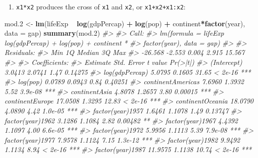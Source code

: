 \documentclass[]{book}
\newenvironment{Shaded}{\begin{snugshade}}{\end{snugshade}}
\newcommand{\KeywordTok}[1]{\textcolor[rgb]{0.13,0.29,0.53}{\textbf{#1}}}
\newcommand{\DataTypeTok}[1]{\textcolor[rgb]{0.13,0.29,0.53}{#1}}
\newcommand{\DecValTok}[1]{\textcolor[rgb]{0.00,0.00,0.81}{#1}}
\newcommand{\StringTok}[1]{\textcolor[rgb]{0.31,0.60,0.02}{#1}}
\newcommand{\CommentTok}[1]{\textcolor[rgb]{0.56,0.35,0.01}{\textit{#1}}}
\newcommand{\OperatorTok}[1]{\textcolor[rgb]{0.81,0.36,0.00}{\textbf{#1}}}
\newcommand{\NormalTok}[1]{#1}
\providecommand{\tightlist}{%
  \setlength{\itemsep}{0pt}\setlength{\parskip}{0pt}}
\begin{document}
\begin{enumerate}
\def\labelenumi{\arabic{enumi}.}
\setcounter{enumi}{1}
\tightlist
\item
  \texttt{x1*x2} produces the cross of \texttt{x1} and \texttt{x2}, or
  \texttt{x1+x2+x1:x2}:
\end{enumerate}

\begin{Shaded}
\begin{Highlighting}[]
\NormalTok{mod.}\DecValTok{2}\NormalTok{ <-}\StringTok{ }\KeywordTok{lm}\NormalTok{(lifeExp }\OperatorTok{~}\StringTok{ }\KeywordTok{log}\NormalTok{(gdpPercap) }\OperatorTok{+}\StringTok{ }\KeywordTok{log}\NormalTok{(pop) }\OperatorTok{+}\StringTok{ }\NormalTok{continent}\OperatorTok{*}\KeywordTok{factor}\NormalTok{(year), }\DataTypeTok{data =}\NormalTok{ gap)}
\KeywordTok{summary}\NormalTok{(mod.}\DecValTok{2}\NormalTok{)}
\CommentTok{#> }
\CommentTok{#> Call:}
\CommentTok{#> lm(formula = lifeExp ~ log(gdpPercap) + log(pop) + continent * }
\CommentTok{#>     factor(year), data = gap)}
\CommentTok{#> }
\CommentTok{#> Residuals:}
\CommentTok{#>     Min      1Q  Median      3Q     Max }
\CommentTok{#> -26.568  -2.553   0.004   2.915  15.567 }
\CommentTok{#> }
\CommentTok{#> Coefficients:}
\CommentTok{#>                                    Estimate Std. Error t value Pr(>|t|)    }
\CommentTok{#> (Intercept)                          3.0413     2.0741    1.47  0.14275    }
\CommentTok{#> log(gdpPercap)                       5.0795     0.1605   31.65  < 2e-16 ***}
\CommentTok{#> log(pop)                             0.0789     0.0943    0.84  0.40251    }
\CommentTok{#> continentAmericas                    7.6960     1.3932    5.52  3.9e-08 ***}
\CommentTok{#> continentAsia                        4.8078     1.2657    3.80  0.00015 ***}
\CommentTok{#> continentEurope                     17.0508     1.3295   12.83  < 2e-16 ***}
\CommentTok{#> continentOceania                    18.0790     4.0890    4.42  1.0e-05 ***}
\CommentTok{#> factor(year)1957                     1.6461     1.1078    1.49  0.13747    }
\CommentTok{#> factor(year)1962                     3.1286     1.1084    2.82  0.00482 ** }
\CommentTok{#> factor(year)1967                     4.4392     1.1097    4.00  6.6e-05 ***}
\CommentTok{#> factor(year)1972                     5.9956     1.1113    5.39  7.9e-08 ***}
\CommentTok{#> factor(year)1977                     7.9578     1.1124    7.15  1.3e-12 ***}
\CommentTok{#> factor(year)1982                     9.9492     1.1134    8.94  < 2e-16 ***}
\CommentTok{#> factor(year)1987                    11.9575     1.1138   10.74  < 2e-16 ***}

\end{Highlighting}
\end{Shaded}
\end{document}
